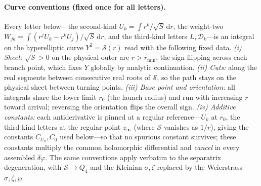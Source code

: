 \documentclass[12pt]{iopart}
\theoremstyle{plain}
\theoremstyle{definition}
\theoremstyle{remark}
\newcommand{\dd}{\mathrm{d}}
\begin{document}
\paragraph{Curve conventions (fixed once for all letters).} Every letter
below---the second-kind $U_k=\int r^k/\sqrt S\,\dd r$, the weight-two
$W_{jk}=\int(r^jU_k-r^kU_j)/\sqrt S\,\dd r$, and the third-kind letters $L,\mathcal
D_k$---is an integral on the hyperelliptic curve $Y^2=\mathcal S(r)$ read with the
following fixed data. \emph{(i) Sheet:} $\sqrt S>0$ on the physical outer arc
$r>r_{\min}$, the sign flipping across each branch point, which fixes $Y$ globally by
analytic continuation. \emph{(ii) Cuts:} along the real segments between consecutive
real roots of $\mathcal S$, so the path stays on the physical sheet between turning
points. \emph{(iii) Base point and orientation:} all integrals share the lower limit
$r_0$ (the launch radius) and run with increasing $r$ toward arrival; reversing the
orientation flips the overall sign. \emph{(iv) Additive constants:} each
antiderivative is pinned at a regular reference---$U_k$ at $r_0$, the third-kind
letters at the regular point $z_\infty$ (where $\mathcal S$ vanishes as $1/r$), giving
the constants $C_{U_0},C_0$ used below---so that no spurious constant survives; these
constants multiply the common holomorphic differential and \emph{cancel} in every
assembled $\delta\varphi$. The same conventions apply verbatim to the separatrix
degeneration, with $\mathcal S\to Q_4$ and the Kleinian $\sigma,\zeta$ replaced by the
Weierstrass $\sigma,\zeta,\wp$.
\end{document}
